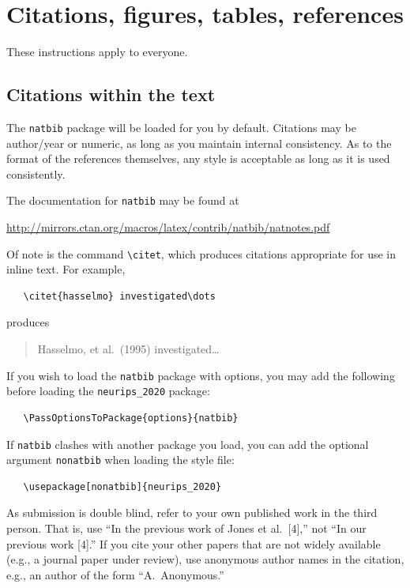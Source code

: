 \documentclass{article}
\begin{document}
\section{Citations, figures, tables, references}
\label{others}

These instructions apply to everyone.

\subsection{Citations within the text}

The \verb+natbib+ package will be loaded for you by default.  Citations may be
author/year or numeric, as long as you maintain internal consistency.  As to the
format of the references themselves, any style is acceptable as long as it is
used consistently.

The documentation for \verb+natbib+ may be found at
\begin{center}
    \url{http://mirrors.ctan.org/macros/latex/contrib/natbib/natnotes.pdf}
\end{center}
Of note is the command \verb+\citet+, which produces citations appropriate for
use in inline text.  For example,
\begin{verbatim}
   \citet{hasselmo} investigated\dots
\end{verbatim}
produces
\begin{quote}
    Hasselmo, et al.\ (1995) investigated\dots
\end{quote}

If you wish to load the \verb+natbib+ package with options, you may add the
following before loading the \verb+neurips_2020+ package:
\begin{verbatim}
   \PassOptionsToPackage{options}{natbib}
\end{verbatim}

If \verb+natbib+ clashes with another package you load, you can add the optional
argument \verb+nonatbib+ when loading the style file:
\begin{verbatim}
   \usepackage[nonatbib]{neurips_2020}
\end{verbatim}

As submission is double blind, refer to your own published work in the third
person. That is, use ``In the previous work of Jones et al.\ [4],'' not ``In our
previous work [4].'' If you cite your other papers that are not widely available
(e.g., a journal paper under review), use anonymous author names in the
citation, e.g., an author of the form ``A.\ Anonymous.''
\end{document}
